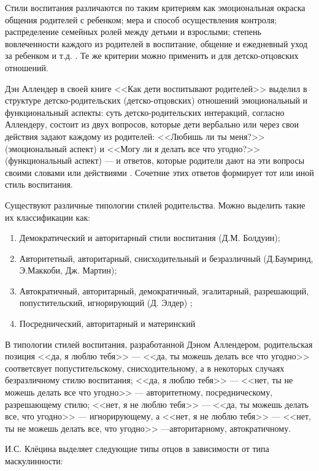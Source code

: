 \documentclass{../../common/thesisbyxetex}
\begin{document}
Стили воспитания различаются по таким критериям как эмоциональная окраска общения родителей с
ребенком; мера и способ осуществления контроля; распределение семейных ролей между детьми и
взрослыми; степень вовлеченности каждого из родителей в воспитание, общение и ежедневный уход за
ребенком и т.д. \cite{stil}. Те же критерии можно применить и для детско-отцовских отношений.

Дэн Аллендер в своей книге <<Как дети воспитывают родителей>> выделил в структуре
детско-родительских (детско-отцовских) отношений эмоциональный и функциональный аспекты: суть
детско-родительских
интеракций, согласно Аллендеру, состоит из двух вопросов, которые дети вербально или
через свои действия задают каждому из родителей: <<Любишь ли ты меня?>> (эмоциональный аспект) и
<<Могу ли я делать все что угодно?>> (функциональный аспект) --- и ответов, которые родители
дают на эти вопросы своими словами или действиями \cite{den}. Сочетние этих ответов формирует тот
или иной стиль воспитания.

Существуют различные типологии стилей родительства. Можно выделить такие их классификации как:

\begin{enumerate}
	\item Демократический и авторитарный стили воспитания (Д.М. Болдуин);
	\item Авторитетный, авторитарный, снисходительный и безразличный (Д.Баумринд, Э.Маккоби, Дж.
Мартин);
	\item Автократичный, авторитарный, демократичный, эгалитарный, разрешающий, попустительский,
игнорирующий (Д. Элдер) \cite{stil};
	\item Посреднический,
	авторитарный  и материнский
\cite[281]{strat}
\end{enumerate}

В типологии стилей воспитания, разработанной Дэном Аллендером, родительская позиция <<да, я
люблю тебя>> --- <<да, ты можешь делать
все что угодно>> соответсвует попустительскому, снисходительному, а в некоторых случаях
безразличному стилю воспитания; <<да, я люблю тебя>>  --- <<нет, ты не можешь делать все что
угодно>> --- авторитетному, посредническому, разрешающему стилю; <<нет, я не люблю тебя>> --- <<да,
ты можешь делать все, что угодно>>  --- игнорирующему, а  <<нет, я не люблю тебя>> --- <<нет, ты не
можешь делать все, что угодно>> ---авторитарному, автократичному.

И.С. Клёцина выделяет следующие типы отцов в зависимости от типа маскулинности:
\end{document}
